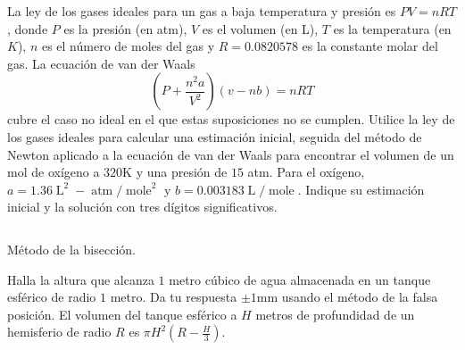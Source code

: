 \begin{questions}
    La ley de los gases ideales para un gas a baja temperatura y
    presión es $PV=nRT$, donde $P$ es la presión (en atm), $V$ es el
    volumen (en L), $T$ es la temperatura (en $K$), $n$ es el número
    de moles del gas y $R=0.0820578$ es la constante molar del gas.
    La ecuación de van der Waals
    \begin{equation*}
        \left(P+\frac{n^{2}a}{V^{2}}\right)
        \left(v-nb\right)
        =nRT
    \end{equation*}
    cubre el caso no ideal en el que estas suposiciones no se
    cumplen.
    Utilice la ley de los gases ideales para calcular una estimación
    inicial, seguida del método de Newton aplicado a la ecuación de
    van der Waals para encontrar el volumen de un mol de oxígeno a
    $320$K y una presión de $15$ atm.
    Para el oxígeno,
    \begin{math}
        a=
        1.36\operatorname{L}^{2}-
        \operatorname{atm}/\operatorname{mole}^{2}
    \end{math}
    y
    \begin{math}
        b=
        0.003183\operatorname{L}/\operatorname{mole}
    \end{math}.
    Indique su estimación inicial y la solución con tres dígitos
    significativos.

    \begin{listing}[ht!]
        \tiny
        \centering
        \inputminted[linenos,highlightlines={7-35}]{octave}{bisect.m}
        \caption{Método de la bisección.}
    \end{listing}


    \question

    Halla la altura que alcanza $1$ metro cúbico de agua almacenada
    en un tanque esférico de radio $1$ metro.
    Da tu respuesta $\pm1$mm usando el método de la falsa posición.
    El volumen del tanque esférico a $H$ metros de profundidad de un
    hemisferio de radio $R$ es $\pi H^{2}\left(R-\frac{H}{3}\right)$.


    \question


\end{questions}

